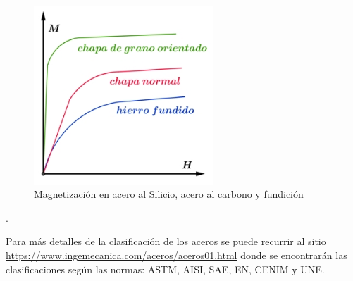 \begin{figure}[h]
	\centering
	\includegraphics[width=0.60\textwidth]{./Figures/FerromagnetismoGranoOrientado.jpg}
	\caption{Magnetización en acero al Silicio, acero al carbono y fundición}
	\label{fig:FerromagnetismoGranoOrientado}
\end{figure}.


Para más detalles de la clasificación de los aceros se puede recurrir al sitio \url{https://www.ingemecanica.com/aceros/aceros01.html} donde se encontrarán las clasificaciones según las normas: ASTM, AISI, SAE, EN, CENIM y UNE. 


